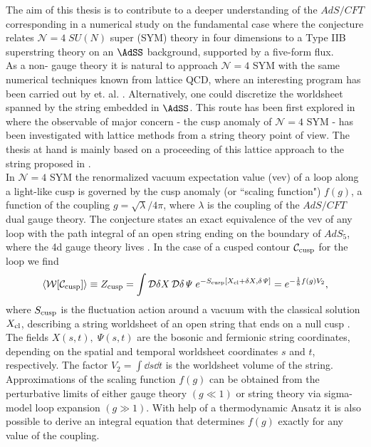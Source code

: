 The aim of this thesis is to contribute to a deeper understanding of the $AdS/CFT$ corresponding in a numerical study on the fundamental case where the conjecture relates $\mathcal{N}=4\; SU(N)$ super  (SYM) theory in four dimensions to a Type IIB superstring theory on an $\AdSS$ background, supported by a  five-form flux.\\
As a non- gauge theory it is natural to approach $\mathcal{N}=4$ SYM with the same numerical techniques known from lattice QCD, where an interesting program has been carried out by  et. al. \cite{Catterall_physrept, Bergner:2016sbv}. Alternatively, one could discretize the worldsheet spanned by the  string embedded in $\AdSS$. This route has been first explored in \cite{Roiban} where the observable of major concern - the cusp anomaly of $\mathcal{N}=4$ SYM - has been investigated with lattice methods from a string theory point of view. The thesis at hand is mainly based on a proceeding of this lattice approach to the  string  proposed in \cite{Bianchi:2016cyv,Forini:2016sot}. \\[0.5cm]
%
%
In $\mathcal{N}=4$ SYM the renormalized vacuum expectation value (vev) of a  loop along a light-like cusp is governed by the cusp anomaly (or ``scaling function") $f(g)$, a function of the coupling $g=\sqrt{\lambda}/4\pi$, where $\lambda$ is the  coupling of the $AdS/CFT$ dual gauge theory. The  conjecture states an exact equivalence of the vev of any  loop with the path integral of an open string ending on the boundary of $AdS_{5}$, where the 4d gauge theory lives \cite{maldacena2}. In the case of a cusped contour $\mathcal{C}_{\rm cusp}$ for the  loop we find
%
%
\begin{equation}
\langle \mathcal{W}[\mathcal{C}_{\rm cusp}] \rangle \equiv Z_{\rm cusp} = \int \mathcal{D}\delta X\,\mathcal{D}\delta\mathit{\Psi} \; e^{-S_{\rm cusp}[X_{\rm cl}+\delta X, \delta\mathit{\Psi} ]  } = e^{-\frac{1}{8}f(g) V_{2}},
\label{eq: intro_W_cusp}
\end{equation}
%
%
where $S_{\rm cusp}$ is the fluctuation action around a vacuum with the classical solution $X_{\rm cl}$, describing a string worldsheet of an open string that ends on a null cusp \cite{Giombi:2009gd}. The fields $X(s,t),\;\mathit{\Psi}(s,t)$ are the bosonic and fermionic string coordinates, depending on the spatial and temporal worldsheet coordinates $s$ and $t$, respectively. The factor $V_{2}=\int \dd s \dd t$ is the worldsheet volume of the string. Approximations of the scaling function $f(g)$ can be obtained from the perturbative limits of either gauge theory \cite{Bern:2006ew} $(g \ll 1)$ or string theory via sigma-model loop expansion \cite{Giombi:2009gd,Gubser:2002tv,Frolov:2002av} $(g \gg 1)$. With help of a thermodynamic  Ansatz it is also possible to derive an integral equation \cite{Beisert:2006ez} that determines $f(g)$ exactly for any value of the coupling.\\[0.5cm]
